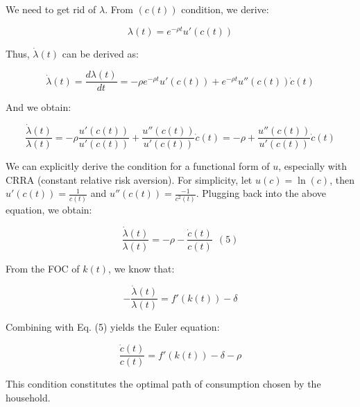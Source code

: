 \documentclass[11pt,a4paper]{book}
\theoremstyle{definition}\newtheorem{definition}{Definition}
\theoremstyle{definition}\newtheorem{fact}{Fact}
\theoremstyle{definition}\newtheorem{remark}{Remark}
\theoremstyle{definition}\newtheorem{ex}{Ex.}
\theoremstyle{definition}\newtheorem{project}{Project}
\theoremstyle{definition}\newtheorem{problem}{Problem}
\theoremstyle{definition}\newtheorem{example}{Example}
\numberwithin{theorem}{section}
\numberwithin{corollary}{chapter}
\numberwithin{assumption}{chapter}
\numberwithin{definition}{chapter}
\numberwithin{prop}{chapter}
\numberwithin{notation}{chapter}
\numberwithin{problem}{chapter}
\numberwithin{example}{chapter}
\numberwithin{fact}{chapter}
\numberwithin{ex}{chapter}
\begin{document}
We need to get rid of $\lambda$. From $(c(t))$ condition, we derive:

$$
    \lambda(t) = e^{-\rho t} u'(c(t))
$$

Thus, $\dot{\lambda}(t)$ can be derived as:

$$
    \dot{\lambda}(t) = \frac{d \lambda(t)}{dt} = -\rho e^{-\rho t} u'(c(t)) + e^{-\rho t} u''(c(t)) \dot{c}(t)
$$

And we obtain:

$$
    \frac{\dot{\lambda}(t)}{\lambda(t)} = -\rho \frac{u'(c(t))}{u'(c(t))} + \frac{u''(c(t))}{u'(c(t))}\dot{c}(t) = - \rho + \frac{u''(c(t))}{u'(c(t))}\dot{c}(t)
$$

We can explicitly derive the condition for a functional form of $u$, especially with CRRA (constant relative risk aversion). For simplicity, let $u(c) = \ln(c)$, then $u'(c(t)) = \frac{1}{c(t)}$ and $u''(c(t)) = \frac{-1}{c^2(t)}$. Plugging back into the above equation, we obtain:

$$
    \frac{\dot{\lambda}(t)}{\lambda(t)} = -\rho - \frac{\dot{c}(t)}{c(t)} \ \ (5)
$$

From the FOC of $k(t)$, we know that:

$$
    - \frac{\dot{\lambda}(t)}{\lambda(t)} = f'(k(t)) - \delta
$$

Combining with Eq. (5) yields the Euler equation:

$$
\frac{\dot{c}(t)}{c(t)} = f'(k(t)) - \delta -\rho
$$

This condition constitutes the optimal path of consumption chosen by the household.
\end{document}
